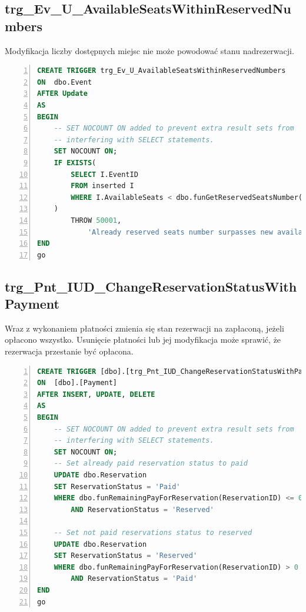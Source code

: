 \documentclass[]{article}
\begin{document}
	\subsection{trg\_Ev\_U\_AvailableSeatsWithinReservedNumbers}
	Modyfikacja liczby dostępnych miejsc nie może powodować stanu nadrezerwacji.
\begin{lstlisting}[language=SQL,
showspaces=false,
basicstyle=\ttfamily,
numbers=left,
numberstyle=\tiny,
tabsize=2,
backgroundcolor=\color{lightg},
keywordstyle=\color{lightblue},
commentstyle=\color{gray}]
CREATE TRIGGER trg_Ev_U_AvailableSeatsWithinReservedNumbers
ON  dbo.Event
AFTER Update
AS 
BEGIN
	-- SET NOCOUNT ON added to prevent extra result sets from
	-- interfering with SELECT statements.
	SET NOCOUNT ON;
	IF EXISTS(
		SELECT I.EventID
		FROM inserted I
		WHERE I.AvailableSeats < dbo.funGetReservedSeatsNumber(I.EventID)				
	)
		THROW 50001,
			'Already reserved seats number surpasses new available seats.', 1
END
go
\end{lstlisting}

	\subsection{trg\_Pnt\_IUD\_ChangeReservationStatusWithPayment}
Wraz z wykonaniem płatności zmienia się stan rezerwacji na zapłaconą, jeżeli opłacono wszystko. Usunięcie płatności lub jej modyfikacja może sprawić, że rezerwacja przestanie być opłacona.
\begin{lstlisting}[language=SQL,
showspaces=false,
basicstyle=\ttfamily,
numbers=left,
numberstyle=\tiny,
tabsize=2,
backgroundcolor=\color{lightg},
keywordstyle=\color{lightblue},
commentstyle=\color{gray}]
CREATE TRIGGER [dbo].[trg_Pnt_IUD_ChangeReservationStatusWithPayment]
ON  [dbo].[Payment]
AFTER INSERT, UPDATE, DELETE
AS 
BEGIN
	-- SET NOCOUNT ON added to prevent extra result sets from
	-- interfering with SELECT statements.
	SET NOCOUNT ON;
	-- Set already paid reservation status to paid
	UPDATE dbo.Reservation
	SET ReservationStatus = 'Paid'
	WHERE dbo.funRemainingPayForReservation(ReservationID) <= 0
	 	AND ReservationStatus = 'Reserved'
	
	-- Set not paid reservations status to reserved
	UPDATE dbo.Reservation
	SET ReservationStatus = 'Reserved'
	WHERE dbo.funRemainingPayForReservation(ReservationID) > 0 
		AND ReservationStatus = 'Paid'
END
go
\end{lstlisting}
\end{document}

